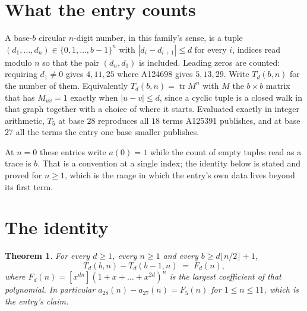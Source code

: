 \documentclass[11pt,a4paper]{article}
\theoremstyle{plain}
\newtheorem{theorem}{Theorem}
\theoremstyle{definition}
\begin{document}
\section{What the entry counts}

A base-$b$ circular $n$-digit number, in this family's sense, is a tuple
$(d_1,\dots,d_n)\in\{0,1,\dots,b-1\}^{n}$ with $|d_i-d_{i+1}|\le d$ for every $i$, indices
read modulo $n$ so that the pair $(d_n,d_1)$ is included. Leading zeros are counted: requiring
$d_1\ne0$ gives $4,11,25$ where A124698 gives $5,13,29$. Write $T_d(b,n)$ for the number of
them. Equivalently $T_d(b,n)=\operatorname{tr}M^{n}$ with $M$ the $b\times b$ matrix that has
$M_{uv}=1$ exactly when $|u-v|\le d$, since a cyclic tuple is a closed walk in that graph
together with a choice of where it starts. Evaluated exactly in integer arithmetic, $T_{5}$
at base $28$ reproduces all $18$ terms A125391 publishes, and at base $27$ all the
terms the entry one base smaller publishes.

At $n=0$ these entries write $a(0)=1$ while the count of empty tuples read as a trace is $b$.
That is a convention at a single index; the identity below is stated and proved for $n\ge1$,
which is the range in which the entry's own data lives beyond its first term.

\section{The identity}

\begin{theorem}
For every $d\ge1$, every $n\ge1$ and every $b\ge d\lfloor n/2\rfloor+1$,
\[
T_d(b,n)-T_d(b-1,n)\;=\;F_d(n),
\]
where $F_d(n)=[x^{dn}](1+x+\dots+x^{2d})^{n}$ is the largest coefficient of that
polynomial. In particular $a_{28}(n)-a_{27}(n)=F_{5}(n)$ for $1\le n\le11$, which
is the entry's claim.
\end{theorem}
\end{document}
